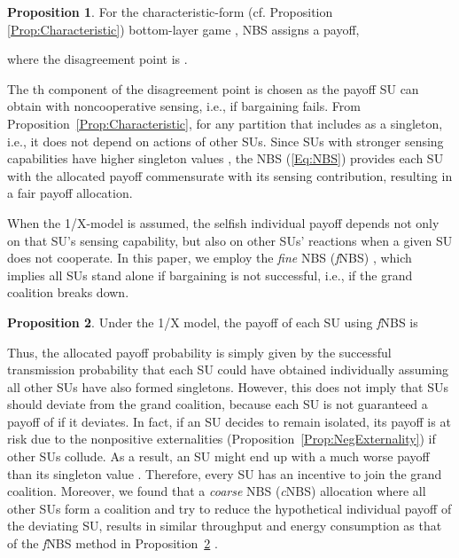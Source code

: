 \documentclass[journal,draftclsnofoot,onecolumn]{IEEEtran}
\theoremstyle{definition}
\newtheorem{Prop}{Proposition}
\begin{document}
\begin{Prop}\label{Prop:NBS}	For the characteristic-form (cf. Proposition \ref{Prop:Characteristic}) bottom-layer game , NBS assigns a payoff,  \cite{NBS,NBSNeg}

where the disagreement point is .
\end{Prop}
\noindent The th component of the disagreement point  is chosen as the payoff SU  can obtain with noncooperative sensing, i.e., if bargaining fails. From Proposition~\ref{Prop:Characteristic},  for any partition  that includes  as a singleton, i.e., it does not depend on actions of other SUs. Since SUs with stronger sensing capabilities have higher singleton values , the NBS (\ref{Eq:NBS}) provides each SU with the allocated payoff commensurate with its sensing contribution, resulting in a fair payoff allocation.

When the 1/X-model is assumed, the selfish individual payoff  depends not only on that SU's sensing capability, but also on other SUs' reactions when a given SU does not cooperate. In this paper, we employ the \textit{fine} NBS (\textit{f}NBS) \cite{NBSNeg}, which implies all SUs stand alone if bargaining is not successful, i.e., if the grand coalition breaks down.

\begin{Prop} \label{Prop:fNBS}Under the 1/X model, the payoff of each SU  using \textit{f}NBS is \cite{NBSNeg}

\end{Prop}
Thus, the allocated payoff probability is simply given by the successful transmission probability that each SU could have obtained individually assuming all other SUs have also formed singletons. However, this does not imply that SUs should deviate from the grand coalition, because each SU is not guaranteed a payoff of  if it deviates. In fact, if an SU decides to remain isolated, its payoff is at risk due to the nonpositive externalities (Proposition~\ref{Prop:NegExternality}) if other SUs collude. As a result, an SU  might end up with a much worse payoff than its singleton value . Therefore, every SU has an incentive to join the grand coalition. Moreover, we found that a \textit{coarse} NBS (\textit{c}NBS) \cite{NBSNeg} allocation where all other SUs form a coalition and try to reduce the hypothetical individual payoff of the deviating SU, results in similar throughput and energy consumption as that of the \textit{f}NBS method in Proposition~\ref{Prop:fNBS} \cite{YLuThesis}.
\end{document}
